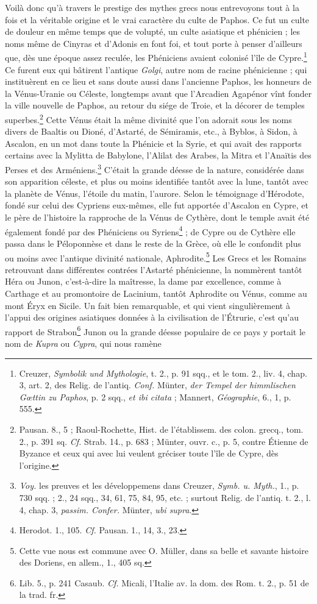 \documentclass[a4paper, 11pt, oneside, polutonikogreek, french]{article}
\begin{document}
Voilà donc qu'à travers le prestige des mythes grecs nous entrevoyons tout à la fois et la véritable origine et le vrai caractère du culte de Paphos. Ce fut un culte de douleur en même temps que de volupté, un culte asiatique et phénicien ; les noms même de Cinyras et d'Adonis en font foi, et tout porte à penser d'ailleurs que, dès une époque assez reculée, les Phéniciens avaient colonisé l'île de Cypre.\footnote{Creuzer, \emph{Symbolik und Mythologie}, t. 2., p. 91 sqq., et le tom. 2., liv. 4, chap. 3, art. 2, des Relig. de l'antiq. \emph{Conf.} Münter, \emph{der Tempel der himmlischen Gœttin zu Paphos}, p. 2 sqq., \emph{et ibi citata} ; Mannert, \emph{Géographie}, 6., 1, p. 555.} Ce furent eux qui bâtirent l'antique \emph{Golgi}, autre nom de racine phénicienne ; qui instituèrent en ce lieu et sans doute aussi dans l'ancienne Paphos, les honneurs de la Vénus-Uranie ou Céleste, longtemps avant que l'Arcadien Agapénor vînt fonder la ville nouvelle de Paphos, au retour du siége de Troie, et la décorer de temples superbes.\footnote{Pausan. 8., 5 ; Raoul-Rochette, Hist. de l'établissem. des colon. grecq., tom. 2., p. 391 sq. \emph{Cf.} Strab. 14., p. 683 ; Münter, ouvr. c., p. 5, contre Étienne de Byzance et ceux qui avec lui veulent gréciser toute l'île de Cypre, dès l'origine.} Cette Vénus était la même divinité que l'on adorait sous les noms divers de Baaltis ou Dioné, d'Astarté, de Sémiramis, etc., à Byblos, à Sidon, à Ascalon, en un mot dans toute la Phénicie et la Syrie, et qui avait des rapports certains avec la Mylitta de Babylone, l'Alilat des Arabes, la Mitra et l'Anaïtis des Perses et des Arméniens.\footnote{\emph{Voy.} les preuves et les développemens dans Creuzer, \emph{Symb. u. Myth.}, 1., p. 730 sqq. ; 2., 24 sqq., 34, 61, 75, 84, 95, etc. ; surtout Relig. de l'antiq. t. 2., l. 4, chap. 3, \emph{passim. Confer.} Münter, \emph{ubi supra}.} C'était la grande déesse de la nature, considérée dans son apparition céleste, et plus ou moins identifiée tantôt avec la lune, tantôt avec la planète de Vénus, l'étoile du matin, l'aurore. Selon le témoignage d'Hérodote, fondé sur celui des Cypriens eux-mêmes, elle fut apportée d'Ascalon en Cypre, et le père de l'histoire la rapproche de la Vénus de Cythère, dont le temple avait été également fondé par des Phéniciens ou Syriens\footnote{Herodot. 1., 105. \emph{Cf.} Pausan. 1., 14, 3., 23.} ; de Cypre ou de Cythère elle passa dans le Péloponnèse et dans le reste de la Grèce, où elle le confondit plus ou moins avec l'antique divinité nationale, Aphrodite.\footnote{Cette vue nous est commune avec O. Müller, dans sa belle et savante histoire des Doriens, en allem., 1., 405 sq.} Les Grecs et les Romains retrouvant dans différentes contrées l'Astarté phénicienne, la nommèrent tantôt Héra ou Junon, c'est-à-dire la maîtresse, la dame par excellence, comme à Carthage et au promontoire de Lacinium, tantôt Aphrodite ou Vénus, comme au mont Éryx en Sicile. Un fait bien remarquable, et qui vient singulièrement à l'appui des origines asiatiques données à la civilisation de l'Étrurie, c'est qu'au rapport de Strabon\footnote{Lib. 5., p. 241 Casaub. \emph{Cf.} Micali, l'Italie av. la dom. des Rom. t. 2., p. 51 de la trad. fr.} Junon ou la grande déesse populaire de ce pays y portait le nom de \emph{Kupra} ou \emph{Cypra}, qui nous ramène 
\end{document}
